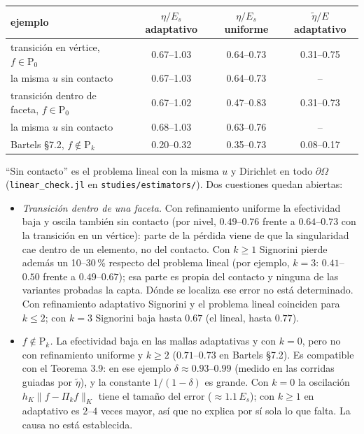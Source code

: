 \documentclass[11pt,a4paper]{article}
\newcommand{\code}[1]{\texttt{#1}}
\newcommand{\Pk}[1]{\mathrm{P}_{#1}}
\begin{document}
\begin{center}
\begin{tabular}{@{}lccc@{}}
\toprule
ejemplo & $\eta/E_s$ adaptativo & $\eta/E_s$ uniforme & $\tilde\eta/E$ adaptativo \\
\midrule
transición en vértice, $f\in\Pk0$          & 0.67--1.03 & 0.64--0.73 & 0.31--0.75 \\
\quad la misma $u$ sin contacto            & 0.67--1.03 & 0.64--0.73 & -- \\
transición dentro de faceta, $f\in\Pk0$    & 0.67--1.02 & 0.47--0.83 & 0.31--0.73 \\
\quad la misma $u$ sin contacto            & 0.68--1.03 & 0.63--0.76 & -- \\
Bartels §7.2, $f\notin\Pk{k}$              & 0.20--0.32 & 0.35--0.73 & 0.08--0.17 \\
\bottomrule
\end{tabular}
\end{center}
``Sin contacto'' es el problema lineal con la misma $u$ y Dirichlet en todo $\partial\Omega$
(\code{linear\_check.jl} en \code{studies/estimators/}). Dos cuestiones quedan abiertas:
\begin{itemize}
  \item \emph{Transición dentro de una faceta.} Con refinamiento uniforme la efectividad baja y
        oscila también sin contacto (por nivel, $0.49$--$0.76$ frente a $0.64$--$0.73$ con la
        transición en un vértice): parte de la pérdida viene de que la singularidad cae dentro de
        un elemento, no del contacto. Con $k\ge1$ Signorini pierde además un 10--30\,\% respecto
        del problema lineal (por ejemplo, $k=3$: $0.41$--$0.50$ frente a $0.49$--$0.67$); esa parte
        es propia del contacto y ninguna de las variantes probadas la capta. Dónde se localiza ese
        error no está determinado. Con refinamiento adaptativo Signorini y el problema lineal
        coinciden para $k\le2$; con $k=3$ Signorini baja hasta $0.67$ (el lineal, hasta $0.77$).
  \item \emph{$f\notin\Pk{k}$.} La efectividad baja en las mallas adaptativas y con $k=0$, pero no
        con refinamiento uniforme y $k\ge2$ ($0.71$--$0.73$ en Bartels §7.2). Es compatible con el
        Teorema 3.9: en ese ejemplo $\delta\approx0.93$--$0.99$ (medido en las corridas guiadas por
        $\tilde\eta$), y la constante $1/(1-\delta)$ es grande. Con $k=0$ la oscilación
        $h_K\|f-\Pi_kf\|_K$ tiene el tamaño del error ($\approx1.1\,E_s$); con $k\ge1$ en
        adaptativo es $2$--$4$ veces mayor, así que no explica por sí sola lo que falta. La causa
        no está establecida.
\end{itemize}
\end{document}
